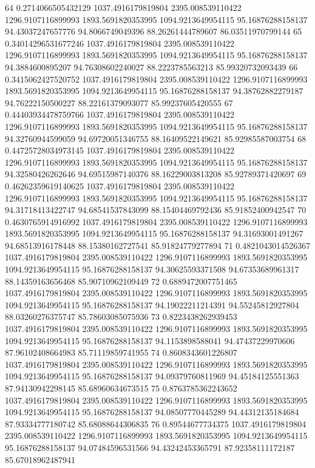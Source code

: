 {64 0.2714066505432129 1037.4916179819804 2395.008539110422 1296.9107116899993 1893.5691820353995 1094.9213649954115 95.16876288158137 94.43037247657776 94.8066749049396 88.26261444789607 86.03511970799144
65 0.34014296531677246 1037.4916179819804 2395.008539110422 1296.9107116899993 1893.5691820353995 1094.9213649954115 95.16876288158137 94.3884600895207 94.76308602240027 88.2223785563213 85.99320732093439
66 0.3415062427520752 1037.4916179819804 2395.008539110422 1296.9107116899993 1893.5691820353995 1094.9213649954115 95.16876288158137 94.38762882279187 94.76222150500227 88.22161379093077 85.99237605420555
67 0.44403934478759766 1037.4916179819804 2395.008539110422 1296.9107116899993 1893.5691820353995 1094.9213649954115 95.16876288158137 94.32760944599059 94.69720051346755 88.16409522149621 85.92985587003754
68 0.44725728034973145 1037.4916179819804 2395.008539110422 1296.9107116899993 1893.5691820353995 1094.9213649954115 95.16876288158137 94.32580426262646 94.69515987140376 88.16229003813208 85.92789371420697
69 0.46262359619140625 1037.4916179819804 2395.008539110422 1296.9107116899993 1893.5691820353995 1094.9213649954115 95.16876288158137 94.31718413422747 94.68541537843099 88.15404469792436 85.91852400942547
70 0.4630765914916992 1037.4916179819804 2395.008539110422 1296.9107116899993 1893.5691820353995 1094.9213649954115 95.16876288158137 94.31693001491267 94.68513916178448 88.15380162727541 85.91824779277894
71 0.4821043014526367 1037.4916179819804 2395.008539110422 1296.9107116899993 1893.5691820353995 1094.9213649954115 95.16876288158137 94.30625593371508 94.67353689961317 88.14359163656468 85.90710962109449
72 0.6889472007751465 1037.4916179819804 2395.008539110422 1296.9107116899993 1893.5691820353995 1094.9213649954115 95.16876288158137 94.19022211214391 94.55245812927804 88.03260276375747 85.78603085075936
73 0.8223438262939453 1037.4916179819804 2395.008539110422 1296.9107116899993 1893.5691820353995 1094.9213649954115 95.16876288158137 94.1153898588041 94.47437229970606 87.96102408664983 85.71119859741955
74 0.8608343601226807 1037.4916179819804 2395.008539110422 1296.9107116899993 1893.5691820353995 1094.9213649954115 95.16876288158137 94.09379760811969 94.45184125551363 87.94130942298145 85.68960634673515
75 0.8763785362243652 1037.4916179819804 2395.008539110422 1296.9107116899993 1893.5691820353995 1094.9213649954115 95.16876288158137 94.08507770445289 94.44312135184684 87.93334777180742 85.68088644306835
76 0.89544677734375 1037.4916179819804 2395.008539110422 1296.9107116899993 1893.5691820353995 1094.9213649954115 95.16876288158137 94.07484596531566 94.43242453365791 87.92358111172187 85.67018962487941
}
